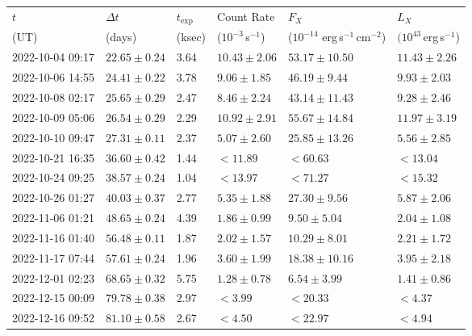 \documentclass{nature_plusfigure}
\newcommand{\at}{AT2022tsd}
\begin{document}
\begin{supplement}
\begin{table*} 
\centering 
\begin{tabular}{llllll}
\hline\hline
$t$ & $\Delta t$ & $t_\mathrm{exp}$ & Count Rate & $F_X$ & $L_X$ \\ 
(UT) & (days) & (ksec) & ($10^{-3}$\,s$^{-1}$) & ($10^{-14}$ erg\,s$^{-1}$\,cm$^{-2}$) & $(10^{43}$\,erg\,s$^{-1}$) \\ 
\hline
2022-10-04 09:17 & $22.65\pm0.24$ & 3.64 & $10.43\pm2.06$ & $53.17\pm10.50$ & $11.43\pm2.26$  \\ 
2022-10-06 14:55 & $24.41\pm0.22$ & 3.78 & $9.06\pm1.85$ & $46.19\pm9.44$ & $9.93\pm2.03$  \\ 
2022-10-08 02:17 & $25.65\pm0.29$ & 2.47 & $8.46\pm2.24$ & $43.14\pm11.43$ & $9.28\pm2.46$  \\ 
2022-10-09 05:06 & $26.54\pm0.29$ & 2.29 & $10.92\pm2.91$ & $55.67\pm14.84$ & $11.97\pm3.19$  \\ 
2022-10-10 09:47 & $27.31\pm0.11$ & 2.37 & $5.07\pm2.60$ & $25.85\pm13.26$ & $5.56\pm2.85$  \\ 
2022-10-21 16:35 & $36.60\pm0.42$ & 1.44 & $<11.89$ & $<60.63$ & $<13.04$  \\ 
2022-10-24 09:25 & $38.57\pm0.24$ & 1.04 & $<13.97$ & $<71.27$ & $<15.32$  \\ 
2022-10-26 01:27 & $40.03\pm0.37$ & 2.77 & $5.35\pm1.88$ & $27.30\pm9.56$ & $5.87\pm2.06$  \\ 
2022-11-06 01:21 & $48.65\pm0.24$ & 4.39 & $1.86\pm0.99$ & $9.50\pm5.04$ & $2.04\pm1.08$  \\ 
2022-11-16 01:40 & $56.48\pm0.11$ & 1.87 & $2.02\pm1.57$ & $10.29\pm8.01$ & $2.21\pm1.72$  \\ 
2022-11-17 07:44 & $57.61\pm0.24$ & 1.96 & $3.60\pm1.99$ & $18.38\pm10.16$ & $3.95\pm2.18$  \\ 
2022-12-01 02:23 & $68.65\pm0.32$ & 5.75 & $1.28\pm0.78$ & $6.54\pm3.99$ & $1.41\pm0.86$  \\ 
2022-12-15 00:09 & $79.78\pm0.38$ & 2.97 & $<3.99$ & $<20.33$ & $<4.37$  \\ 
2022-12-16 09:52 & $81.10\pm0.58$ & 2.67 & $<4.50$ & $<22.97$ & $<4.94$  \\ 
\hline 
\end{tabular} 
\caption{Swift XRT (0.3--10\,keV) observations of \at\ with epochs $\Delta t$ since discovery in the rest frame, exposure time $t_\mathrm{exp}$, flux $F_X$, and luminosity $L_X$. Upper limits are given as 3-$\sigma$.} 
\label{tab:xray-observations} 
\end{table*} 


\end{supplement}
\end{document}
